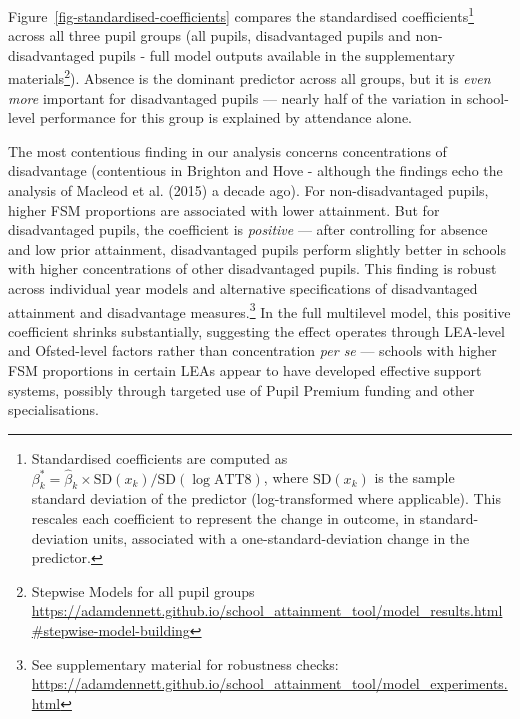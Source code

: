 \documentclass[
  12pt,
  titlepage]{article}
\begin{document}
Figure~\ref{fig-standardised-coefficients} compares the standardised
coefficients\footnote{Standardised coefficients are computed as
  \(\beta^*_k = \hat{\beta}_k \times \text{SD}(x_k) / \text{SD}(\log \text{ATT8})\),
  where \(\text{SD}(x_k)\) is the sample standard deviation of the
  predictor (log-transformed where applicable). This rescales each
  coefficient to represent the change in outcome, in standard-deviation
  units, associated with a one-standard-deviation change in the
  predictor.} across all three pupil groups (all pupils, disadvantaged
pupils and non-disadvantaged pupils - full model outputs available in
the supplementary materials\footnote{Stepwise Models for all pupil
  groups
  \url{https://adamdennett.github.io/school_attainment_tool/model_results.html\#stepwise-model-building}}).
Absence is the dominant predictor across all groups, but it is
\emph{even more} important for disadvantaged pupils --- nearly half of
the variation in school-level performance for this group is explained by
attendance alone.

The most contentious finding in our analysis concerns concentrations of
disadvantage (contentious in Brighton and Hove - although the findings
echo the analysis of Macleod et al. (2015) a decade ago). For
non-disadvantaged pupils, higher FSM proportions are associated with
lower attainment. But for disadvantaged pupils, the coefficient is
\emph{positive} --- after controlling for absence and low prior
attainment, disadvantaged pupils perform slightly better in schools with
higher concentrations of other disadvantaged pupils. This finding is
robust across individual year models and alternative specifications of
disadvantaged attainment and disadvantage measures.\footnote{See
  supplementary material for robustness checks:
  \url{https://adamdennett.github.io/school_attainment_tool/model_experiments.html}}
In the full multilevel model, this positive coefficient shrinks
substantially, suggesting the effect operates through LEA-level and
Ofsted-level factors rather than concentration \emph{per se} --- schools
with higher FSM proportions in certain LEAs appear to have developed
effective support systems, possibly through targeted use of Pupil
Premium funding and other specialisations.
\end{document}
